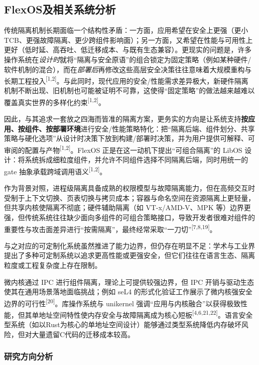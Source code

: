 \documentclass[UTF8,a4paper,12pt,twoside]{ctexart}  %
\begin{document}
\subsection{FlexOS及相关系统分析}

传统隔离机制长期面临一个结构性矛盾：一方面，应用希望在安全上更强（更小 TCB、更强故障隔离、更少跨组件影响面）；另一方面，又希望在性能与可用性上更好（低时延、高吞吐、低迁移成本、与既有生态兼容）。更现实的问题是，许多操作系统在\emph{设计时}就将“隔离与安全原语”的组合锁定为固定策略（例如某种硬件/软件机制的混合），而在\emph{部署后}再修改这些高层安全决策往往意味着大规模重构与长期工程投入\textsuperscript{[1,2]}。与此同时，现代应用的安全/性能需求差异极大，新硬件隔离机制不断出现、旧机制也可能被证明不可靠，这使得“固定策略”的做法越来越难以覆盖真实世界的多样化约束\textsuperscript{[1,2]}。

因此，与其追求一套放之四海而皆准的隔离方案，更务实的方向是让系统支持\textbf{按应用、按组件、按部署环境}进行安全/性能策略特化：把“隔离后端、组件划分、共享策略与硬化选项”从设计时决策下放到构建/部署时决策，并为用户提供可解释、可审阅的配置与产物\textsuperscript{[1,2]}。FlexOS 正是在这一动机下提出“可组合隔离”的 LibOS 设计：将系统拆成细粒度组件，并允许不同组件选择不同隔离后端，同时用统一的 gate 抽象承载跨域调用语义\textsuperscript{[1,2]}。

作为背景对照，进程级隔离具备成熟的权限模型与故障隔离能力，但在高频交互时受制于上下文切换、页表切换与拷贝成本；容器与命名空间在资源隔离上更轻量，但共享内核使隔离不彻底；硬件辅助隔离（如 VT-x/AMD-V、MPK 等）边界更强，但传统系统往往缺少面向多组件的可组合策略接口，导致开发者很难对组件的重要性与攻击面差异进行“按需隔离”，最终经常采取“一刀切”\textsuperscript{[7,8,19]}。

与之对应的可定制化系统虽然推进了能力边界，但仍存在明显不足：学术与工业界提出了多种可定制系统以追求更高性能或更强安全，但它们往往在语言生态、隔离粒度或工程复杂度上存在限制。

微内核通过 IPC 进行组件隔离，理论上可提供较强边界，但 IPC
开销与驱动生态使其在通用场景落地面临挑战；例如 seL4
的形式化验证工作展示了微内核强安全边界的可行性\textsuperscript{[20]}。库操作系统与
unikernel
强调``应用与内核融合''以获得极致性能，但其单地址空间特性使内存安全与故障隔离成为核心短板\textsuperscript{[4,6,21,22]}。语言安全型系统（如以Rust为核心的单地址空间设计）能够通过类型系统降低内存破坏风险，但对大量遗留C代码的迁移成本较高。

\subsubsection{研究方向分析}
\end{document}
